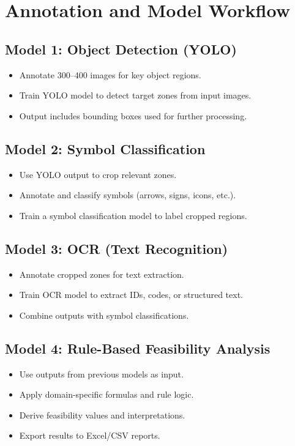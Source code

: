 \documentclass{article}
\begin{document}
\section*{Annotation and Model Workflow}

\subsection*{Model 1: Object Detection (YOLO)}
\begin{itemize}
    \item Annotate 300--400 images for key object regions.
    \item Train YOLO model to detect target zones from input images.
    \item Output includes bounding boxes used for further processing.
\end{itemize}

\subsection*{Model 2: Symbol Classification}
\begin{itemize}
    \item Use YOLO output to crop relevant zones.
    \item Annotate and classify symbols (arrows, signs, icons, etc.).
    \item Train a symbol classification model to label cropped regions.
\end{itemize}

\subsection*{Model 3: OCR (Text Recognition)}
\begin{itemize}
    \item Annotate cropped zones for text extraction.
    \item Train OCR model to extract IDs, codes, or structured text.
    \item Combine outputs with symbol classifications.
\end{itemize}

\subsection*{Model 4: Rule-Based Feasibility Analysis}
\begin{itemize}
    \item Use outputs from previous models as input.
    \item Apply domain-specific formulas and rule logic.
    \item Derive feasibility values and interpretations.
    \item Export results to Excel/CSV reports.
\end{itemize}
\end{document}
